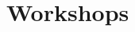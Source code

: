 \documentclass[11pt, chapterprefix=true]{scrbook}\usepackage[]{graphicx}\usepackage[]{color}
\begin{document}
% 
% 
% 
% 
% 





\chapter{Workshops}
\label{chap:ch18}
\end{document}
